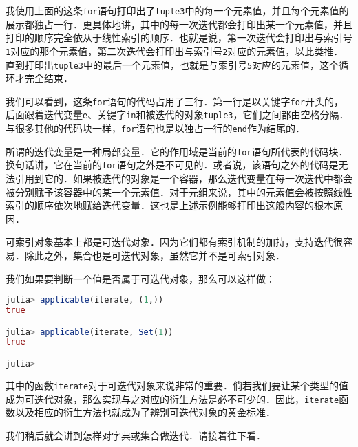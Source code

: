 我使用上面的这条\verb|for|语句打印出了\verb|tuple3|中的每一个元素值，并且每个元素值的展示都独占一行．更具体地讲，其中的每一次迭代都会打印出某一个元素值，并且打印的顺序完全依从于线性索引的顺序．也就是说，第一次迭代会打印出与索引号\verb|1|对应的那个元素值，第二次迭代会打印出与索引号\verb|2|对应的元素值，以此类推．直到打印出\verb|tuple3|中的最后一个元素值，也就是与索引号\verb|5|对应的元素值，这个循环才完全结束．

我们可以看到，这条\verb|for|语句的代码占用了三行．第一行是以关键字\verb|for|开头的，后面跟着迭代变量\verb|e|、关键字\verb|in|和被迭代的对象\verb|tuple3|，它们之间都由空格分隔．与很多其他的代码块一样，\verb|for|语句也是以独占一行的\verb|end|作为结尾的．

所谓的迭代变量是一种局部变量．它的作用域是当前的\verb|for|语句所代表的代码块．换句话讲，它在当前的\verb|for|语句之外是不可见的．或者说，该语句之外的代码是无法引用到它的．如果被迭代的对象是一个容器，那么迭代变量在每一次迭代中都会被分别赋予该容器中的某一个元素值．对于元组来说，其中的元素值会被按照线性索引的顺序依次地赋给迭代变量．这也是上述示例能够打印出这般内容的根本原因．

可索引对象基本上都是可迭代对象．因为它们都有索引机制的加持，支持迭代很容易．除此之外，集合也是可迭代对象，虽然它并不是可索引对象．

我们如果要判断一个值是否属于可迭代对象，那么可以这样做：
\begin{lstlisting}[language=julia]
julia> applicable(iterate, (1,))
true

julia> applicable(iterate, Set(1))
true

julia> 
\end{lstlisting}

其中的函数\verb|iterate|对于可迭代对象来说非常的重要．倘若我们要让某个类型的值成为可迭代对象，那么实现与之对应的衍生方法是必不可少的．因此，\verb|iterate|函数以及相应的衍生方法也就成为了辨别可迭代对象的黄金标准．

我们稍后就会讲到怎样对字典或集合做迭代．请接着往下看．
